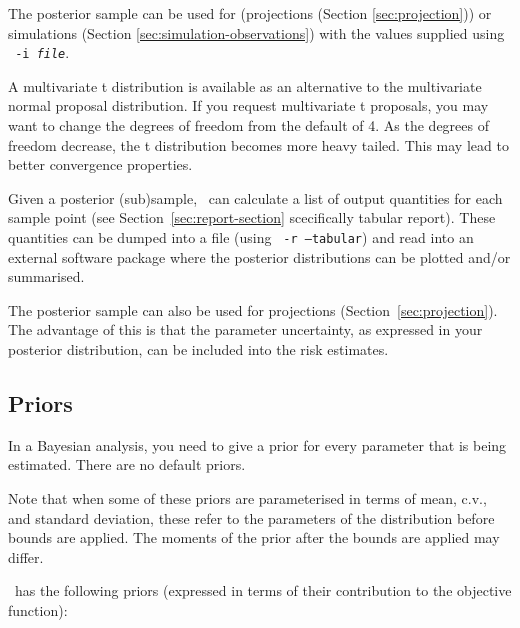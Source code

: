 The posterior sample can be used for (projections (Section \ref{sec:projection})) or simulations (Section \ref{sec:simulation-observations}) with the values supplied using \texttt{\cname\ -i \emph{file}}.


A multivariate t distribution is available as an alternative to the multivariate normal proposal distribution. If you request multivariate t proposals, you may want to change the degrees of freedom from the default of 4. As the degrees of freedom decrease, the t distribution becomes more heavy tailed. This may lead to better convergence properties.


Given a posterior (sub)sample, \CNAME\ can calculate a list of output quantities for each sample point (see Section~\ref{sec:report-section} scecifically tabular report). These quantities can be dumped into a file (using \texttt{\cname\ -r --tabular}) and read into an external software package where the posterior distributions can be plotted and/or summarised. 

The posterior sample can also be used for projections (Section~\ref{sec:projection}). The advantage of this is that the parameter uncertainty, as expressed in your posterior distribution, can be included into the risk estimates.

\subsection{Priors\label{sec:priors}}

In a Bayesian analysis, you need to give a prior for every parameter that is being estimated. There are no default priors.  

Note that when some of these priors are parameterised in terms of mean, c.v., and standard deviation, these refer to the parameters of the distribution before bounds are applied. The moments of the prior after the bounds are applied may differ.

\CNAME\ has the following priors (expressed in terms of their contribution to the objective function): 

